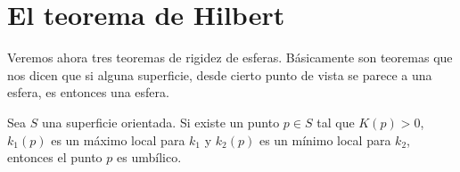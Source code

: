 \chapter{El teorema de Hilbert}

Veremos ahora tres teoremas de rigidez de esferas. Básicamente son teoremas que
nos dicen que si alguna superficie, desde cierto punto de vista se parece a una
esfera, es entonces una esfera. 


\begin{theorem}[Hilbert]
	Sea $S$ una superficie orientada. Si existe un punto $p\in S$ tal que
	$K(p)>0$, $k_1(p)$ es un máximo local para $k_1$ y $k_2(p)$ es un mínimo
	local para $k_2$, entonces el punto $p$ es umbílico.
\end{theorem}

